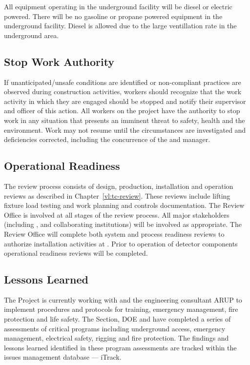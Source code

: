 All equipment operating in the underground facility will be diesel or
electric powered. There will be no gasoline or propane powered
equipment in the underground facility. Diesel is allowed due to the large
ventillation rate in the underground area.

\subsection{Stop Work Authority}

If unanticipated/unsafe conditions are identified or non-compliant
practices are observed during construction activities, workers should
recognize that the work activity in which they are engaged should be
stopped and notify their supervisor and  officer of
this action. All workers on the  project have the
authority to stop work in any situation that presents an imminent
threat to safety, health and the environment. Work may not resume
until the circumstances are investigated and deficiencies corrected,
including the concurrence of the  
and   manager.

\subsection{Operational Readiness}

The  review process consists of design, production,
installation and operation reviews as described in
Chapter~\ref{vl:tc-review}. These reviews include lifting fixture
load testing and work planning and controls documentation. The
 Review Office is involved at all stages of the review
process. All major stakeholders (including \fnal,  and
 collaborating institutions) will be involved as
appropriate. The Review Office will complete both system and process
readiness reviews to authorize installation activities at
.  Prior to operation of detector components operational
readiness reviews will be completed.

\subsection{Lessons Learned}

The  Project is currently working with  and the 
engineering consultant ARUP to implement  procedures and
protocols for training, emergency management, fire
protection and life safety. The \fnal {} Section, DOE and
  have completed a series of assessments of
critical   programs including underground access,
emergency management, electrical safety, rigging and fire
protection. The findings and lessons learned identified in these
 program assessments are tracked within the \fnal issues management
database --- iTrack.

